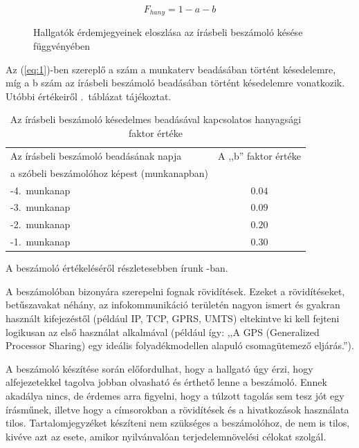 \documentclass[a4paper,oneside]{article}
\begin{document}
\begin{equation}
    F_{hany} = 1 - a - b
  \label{eq:1}
\end{equation}


\begin{figure}[tbh]
  \centering
  \caption{Hallgatók érdemjegyeinek eloszlása az írásbeli beszámoló késése függvényében}
  \label{fig:fig1}
\end{figure}

Az (\ref{eq:1})-ben szereplő a szám a munkaterv beadásában történt
késedelemre, míg a b szám az írásbeli beszámoló beadásában történt
késedelemre vonatkozik.  Utóbbi értékeiről
.~táblázat tájékoztat.

\begin{table}
  \centering
    \begin{tabular}{|l|c|}
      \hline
      Az írásbeli beszámoló beadásának napja     & A ,,b'' faktor értéke \\
      a szóbeli beszámolóhoz képest (munkanapban) & ~ \\ \hline          
      -4.~munkanap & $0.04$ \\ \hline 
      -3.~munkanap & $0.09$ \\ \hline 
      -2.~munkanap & $0.20$ \\ \hline 
      -1.~munkanap & $0.30$ \\ \hline
      \end{tabular}
    \caption{Az írásbeli beszámoló késedelmes beadásával kapcsolatos hanyagsági faktor értéke}
  \label{tab:hanyagsagi}
\end{table}

A beszámoló értékeléséről részletesebben írunk \cite{web}-ban.

A beszámolóban bizonyára szerepelni fognak rövidítések. Ezeket a
rövidítéseket, betűszavakat néhány, az infokommunikáció területén
nagyon ismert és gyakran használt kifejezéstől (például IP, TCP, GPRS,
UMTS) eltekintve ki kell fejteni logikusan az első használat
alkalmával (például így: ,,A GPS (Generalized Processor Sharing) egy
ideális folyadékmodellen alapuló csomagütemező eljárás.'').

A beszámoló készítése során előfordulhat, hogy a hallgató úgy érzi,
hogy alfejezetekkel tagolva jobban olvasható és érthető lenne a
beszámoló.  Ennek akadálya nincs, de érdemes arra figyelni, hogy a
túlzott tagolás sem tesz jót egy írásműnek, illetve hogy a címsorokban
a rövidítések és a hivatkozások használata tilos.  Tartalomjegyzéket
készíteni nem szükséges a beszámolóhoz, de nem is tilos, kivéve azt az
esete, amikor nyilvánvalóan terjedelemnövelési célokat szolgál.
\end{document}
